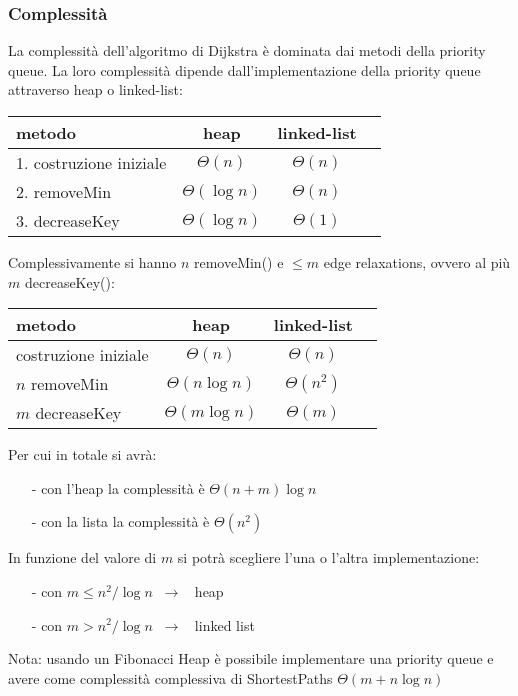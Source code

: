 \documentclass[a4paper]{article}
\begin{document}
\subsubsection*{Complessità}
La complessità dell'algoritmo di Dijkstra è dominata dai metodi della priority queue. La loro complessità dipende dall'implementazione
della priority queue attraverso heap o linked-list:
\begin{center}
	\begin{tabular}{l | c | c | c}
		\textbf{metodo} & \textbf{heap} & \textbf{linked-list} \\
		\toprule
		1. costruzione iniziale & \(\Theta(n)\) & \(\Theta(n)\) \\
		\midrule
		2. removeMin & \(\Theta(\log n)\) & \(\Theta(n)\) \\
		\midrule
		3. decreaseKey & \(\Theta(\log n)\) & \(\Theta(1)\) \\
		\bottomrule
	\end{tabular}
\end{center}
Complessivamente si hanno \(n\) removeMin() e \(\leq m\) edge relaxations, ovvero al più \(m\) decreaseKey():
\begin{center}
	\begin{tabular}{l | c | c | c}
		\textbf{metodo} & \textbf{heap} & \textbf{linked-list} \\
		\toprule
		costruzione iniziale & \(\Theta(n)\) & \(\Theta(n)\) \\
		\midrule
		\(n\) removeMin & \(\Theta(n \log n)\) & \(\Theta(n^2)\) \\
		\midrule
		\(m\) decreaseKey & \(\Theta(m \log n)\) & \(\Theta(m)\) \\
		\bottomrule
	\end{tabular}
\end{center}
Per cui in totale si avrà:
\begin{itemize}[topsep=3pt, itemsep=0pt]
	\item[-] con l'heap la complessità è \(\Theta(n+m) \log n\)
	\item[-] con la lista la complessità è \(\Theta(n^2)\)
\end{itemize}
In funzione del valore di \(m\) si potrà scegliere l'una o l'altra implementazione:
\begin{itemize}[topsep=3pt, itemsep=0pt]
	\item[-] con \(m \leq n^2 / \log n \;\; \rightarrow \;\;\) heap
	\item[-] con \(m > n^2 / \log n \;\; \rightarrow \;\;\) linked list
\end{itemize}
Nota: usando un Fibonacci Heap è possibile implementare una priority queue e avere come complessità complessiva di ShortestPaths
\(\Theta(m + n \log n)\)
\end{document}
